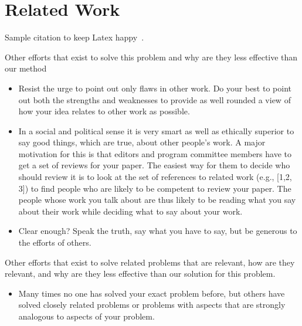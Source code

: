 
\section{Related Work}

Sample citation to keep Latex happy~\cite{HennessyPatterson:CompArch5thEd:2011}.

Other efforts that exist to solve this problem and why are they less effective than our method
\begin{itemize}
    \item Resist the urge to point out only flaws in other work. Do your best to point out both the strengths and weaknesses to provide as well rounded a view of how your idea relates to other work as possible.
    \item In a social and political sense it is very smart as well as ethically superior to say good things, which are true, about other people’s work. A major motivation for this is that editors and program committee members have to get a set of reviews for your paper. The easiest way for them to decide who should review it is to look at the set of references to related work (e.g., [1,2, 3]) to find people who are likely to be competent to review your paper. The people whose work you talk about are thus likely to be reading what you say about their work while deciding what to say about your work.
    \item  Clear enough? Speak the truth, say what you have to say, but be generous to the efforts of others.
\end{itemize}

Other efforts that exist to solve related problems that are relevant, how are they relevant, and why are they less effective than our solution for this problem.

\begin{itemize}
    \item  Many times no one has solved your exact problem before, but others have solved closely related problems or problems with aspects that are strongly analogous to aspects of your problem.
\end{itemize}



